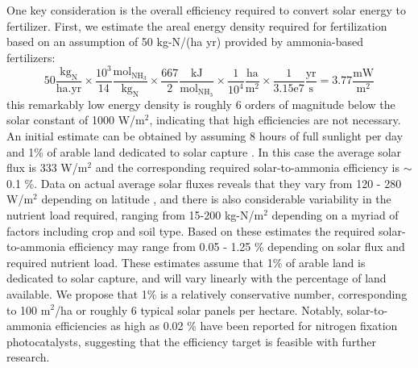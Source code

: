 One key consideration is the overall efficiency required to convert solar energy to fertilizer. First, we estimate the areal energy density required for fertilization based on an assumption of 50 kg-N/(ha yr) provided by ammonia-based fertilizers:
\begin{equation}
\mathrm{
50 \frac{kg_N}{ha . yr} \times \frac{10^3}{14} \frac{mol_{NH_3}}{kg_N} \times \frac{667}{2} \frac{kJ}{mol_{NH_3}} \times \frac{1}{10^4} \frac{ha}{m^2} \times \frac{1}{3.15e7} \frac{yr}{s} = 3.77 \frac{mW}{m^2}
}
\end{equation}
this remarkably low energy density is roughly 6 orders of magnitude below the solar constant of 1000 W/m$^2$, indicating that high efficiencies are not necessary. An initial estimate can be obtained by assuming 8 hours of full sunlight per day and 1\% of arable land dedicated to solar capture \cite{Medford_2017}. In this case the average solar flux is 333 W/m$^2$ and the corresponding required solar-to-ammonia efficiency is $\sim$0.1 \%. Data on actual average solar fluxes reveals that they vary from 120 - 280 W/m$^2$ depending on latitude \cite{MacKay_2013}, and there is also considerable variability in the nutrient load required, ranging from 15-200 kg-N/m$^2$ depending on a myriad of factors including crop and soil type. Based on these estimates the required solar-to-ammonia efficiency may range from 0.05 - 1.25 \% depending on solar flux and required nutrient load. These estimates assume that 1\% of arable land is dedicated to solar capture, and will vary linearly with the percentage of land available. We propose that 1\% is a relatively conservative number, corresponding to 100 m$^2$/ha or roughly 6 typical solar panels per hectare. Notably, solar-to-ammonia efficiencies as high as 0.02 \% have been reported for nitrogen fixation photocatalysts, suggesting that the efficiency target is feasible with further research.

